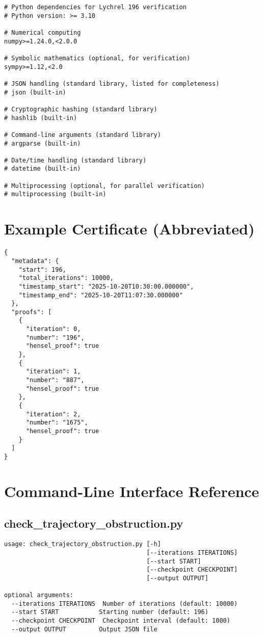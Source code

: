 \documentclass[11pt,a4paper]{article}
\begin{document}
\begin{lstlisting}[style=bashstyle, caption={Complete Dependencies File}]
# Python dependencies for Lychrel 196 verification
# Python version: >= 3.10

# Numerical computing
numpy>=1.24.0,<2.0.0

# Symbolic mathematics (optional, for verification)
sympy>=1.12,<2.0

# JSON handling (standard library, listed for completeness)
# json (built-in)

# Cryptographic hashing (standard library)
# hashlib (built-in)

# Command-line arguments (standard library)
# argparse (built-in)

# Date/time handling (standard library)
# datetime (built-in)

# Multiprocessing (optional, for parallel verification)
# multiprocessing (built-in)
\end{lstlisting}

\section{Example Certificate (Abbreviated)}

\begin{lstlisting}[style=jsonstyle, caption={Sample Certificate (First 3 Proofs)}]
{
  "metadata": {
    "start": 196,
    "total_iterations": 10000,
    "timestamp_start": "2025-10-20T10:30:00.000000",
    "timestamp_end": "2025-10-20T11:07:30.000000"
  },
  "proofs": [
    {
      "iteration": 0,
      "number": "196",
      "hensel_proof": true
    },
    {
      "iteration": 1,
      "number": "887",
      "hensel_proof": true
    },
    {
      "iteration": 2,
      "number": "1675",
      "hensel_proof": true
    }
  ]
}
\end{lstlisting}

\section{Command-Line Interface Reference}

\subsection{check\_trajectory\_obstruction.py}

\begin{lstlisting}[style=bashstyle]
usage: check_trajectory_obstruction.py [-h] 
                                       [--iterations ITERATIONS]
                                       [--start START]
                                       [--checkpoint CHECKPOINT]
                                       [--output OUTPUT]

optional arguments:
  --iterations ITERATIONS  Number of iterations (default: 10000)
  --start START           Starting number (default: 196)
  --checkpoint CHECKPOINT  Checkpoint interval (default: 1000)
  --output OUTPUT         Output JSON file
\end{lstlisting}
\end{document}
